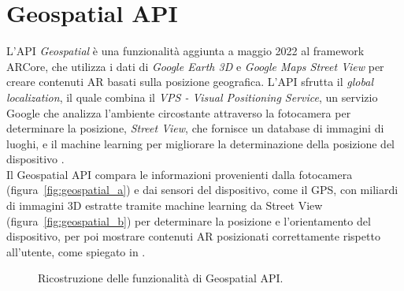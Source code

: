 \documentclass[crop=false, class=book]{standalone}
\begin{document}
	\chapter{Geospatial API}
	
	L'API \textit{Geospatial} è una funzionalità aggiunta a maggio 2022 al framework ARCore, che utilizza i dati di \textit{Google Earth 3D} e \textit{Google Maps Street View} per creare contenuti AR basati sulla posizione geografica. L'API sfrutta il \textit{global localization}, il quale combina il \textit{VPS - Visual Positioning Service}, un servizio Google che analizza l'ambiente circostante attraverso la fotocamera per determinare la posizione, \textit{Street View}, che fornisce un database di immagini di luoghi, e il machine learning per migliorare la determinazione della posizione del dispositivo \cite{googleblog2019global}.
	\\
	\noindent
	Il Geospatial API compara le informazioni provenienti dalla fotocamera (figura~\vref{fig:geospatial_a}) e dai sensori del dispositivo, come il GPS, con miliardi di immagini 3D estratte tramite machine learning da Street View (figura~\vref{fig:geospatial_b}) per determinare la posizione e l'orientamento del dispositivo, per poi mostrare contenuti AR posizionati correttamente rispetto all'utente, come spiegato in \cite{googleblog2022geospatial}.
	
	\begin{figure}[tbph]
		\centering
		  \quad
		 \quad
		\caption{Ricostruzione delle funzionalità di Geospatial API.}
		\label{fig:geospatial}
	\end{figure}
\end{document}

